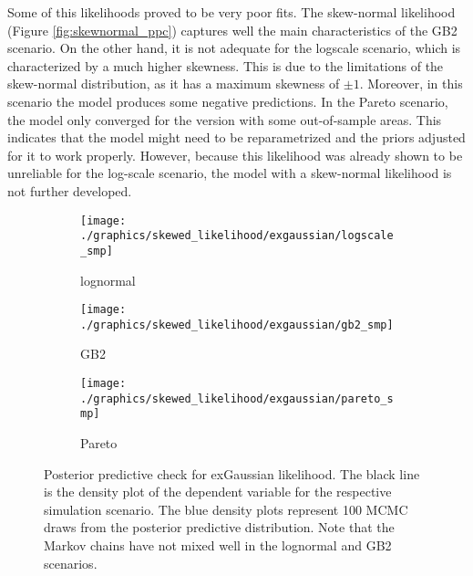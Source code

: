 Some of this likelihoods proved to be very poor fits.
The skew-normal likelihood (Figure \ref{fig:skewnormal_ppc}) captures well the main characteristics of the GB2 scenario. On the other hand, it is not adequate for the logscale scenario, which is characterized by a much higher skewness.
This is due to the limitations of the skew-normal distribution, as it has a maximum skewness of $\pm 1$.
Moreover, in this scenario the model produces some negative predictions.
In the Pareto scenario, the model only converged for the version with some out-of-sample areas.
This indicates that the model might need to be reparametrized and the priors adjusted for it to work properly.
However, because this likelihood was already shown to be unreliable for the log-scale scenario, the model with a skew-normal likelihood is not further developed.

\begin{figure}[h]
    \centering
    \begin{subfigure}{0.29\textwidth}
        \texttt{[image: ./graphics/skewed\_likelihood/exgaussian/logscale\_smp]}
        \caption{lognormal}
    \end{subfigure}
    \begin{subfigure}{0.29\textwidth}
        \texttt{[image: ./graphics/skewed\_likelihood/exgaussian/gb2\_smp]}
        \caption{GB2}
    \end{subfigure}
    \begin{subfigure}{0.29\textwidth}
        \texttt{[image: ./graphics/skewed\_likelihood/exgaussian/pareto\_smp]}
        \caption{Pareto}
    \end{subfigure}

    \caption[Posterior predictive check for exGaussian likelihood]{Posterior predictive check for exGaussian likelihood. The black line is the density plot of the dependent variable for the respective simulation scenario. The blue density plots represent 100 MCMC draws from the posterior predictive distribution. Note that the Markov chains have not mixed well in the lognormal and GB2 scenarios.}
    \label{fig:exgaussian_ppc}
\end{figure}

